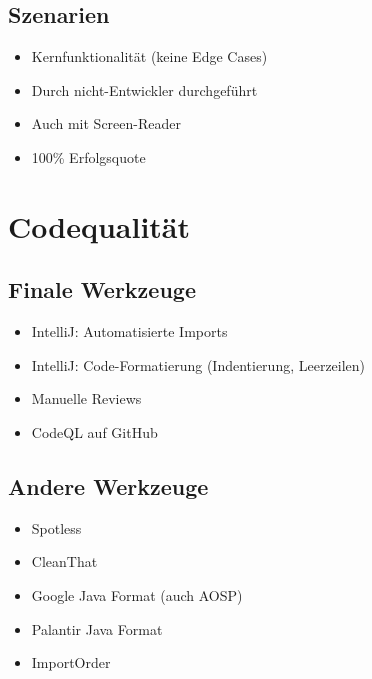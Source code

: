 \documentclass{sdqbeamer}
\begin{document}
\subsection{Szenarien}
\begin{frame}{\insertsubsectionhead}
    \begin{itemize}
        \item Kernfunktionalität (keine Edge Cases)
        \item Durch nicht-Entwickler durchgeführt
        \item Auch mit Screen-Reader
        \item 100\% Erfolgsquote
    \end{itemize}
\end{frame}



\section{Codequalität}

\subsection{Finale Werkzeuge}
\begin{frame}{\insertsubsectionhead}
    \begin{itemize}
        \item IntelliJ: Automatisierte Imports
        \item IntelliJ: Code-Formatierung (Indentierung, Leerzeilen)
        \item Manuelle Reviews
        \item CodeQL auf GitHub
    \end{itemize}
\end{frame}

\subsection{Andere Werkzeuge}
\begin{frame}{\insertsubsectionhead}
    \begin{itemize}
        \item Spotless
        \item CleanThat
        \item Google Java Format (auch AOSP)
        \item Palantir Java Format
        \item ImportOrder
    \end{itemize}
\end{frame}
\end{document}

